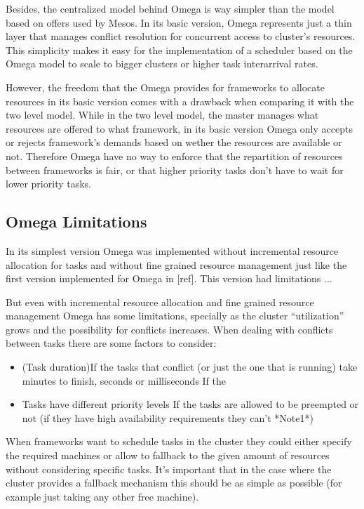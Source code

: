 \documentclass{svjour3}                     %
\begin{document}
Besides, the centralized model behind Omega is way simpler than the
model based on offers used by Mesos. In its basic version, Omega
represents just a thin layer that manages conflict resolution for
concurrent access to cluster's resources. This simplicity makes it
easy for the implementation of a scheduler based on the Omega model to
scale to bigger clusters or higher task interarrival rates.

However, the freedom that the Omega provides for frameworks to
allocate resources in its basic version comes with a drawback when
comparing it with the two level model. While in the two level model,
the master manages what resources are offered to what framework, in
its basic version Omega only accepts or rejects framework's demands
based on wether the resources are available or not.  Therefore Omega
have no way to enforce that the repartition of resources between
frameworks is fair, or that higher priority tasks don't have to wait
for lower priority tasks.

\subsection{Omega Limitations}

In its simplest version Omega was implemented without incremental
resource allocation for tasks and without fine grained resource
management just like the first version implemented for Omega in
[ref]. This version had limitations ...

But even with incremental resource allocation and fine grained
resource management Omega has some limitations, specially as the
cluster ``utilization'' grows and the possibility for conflicts
increases. When dealing with conflicts between tasks there are some
factors to consider:

 \begin{itemize}
   \item (Task duration)If the tasks that conflict (or just the one that is
   running) take minutes to finish, seconds or milliseconds If the
  \item Tasks have different priority levels If the tasks are allowed to be
  preempted or not (if they have high availability requirements they
  can't *Note1*)
 \end{itemize}

When frameworks want to schedule tasks in the cluster they could either specify the required
machines or allow to fallback to the given amount of resources without considering specific
tasks. It's important that in the case where the cluster provides a fallback mechanism 
this should be as simple as possible (for example just taking any other free machine).
\end{document}
